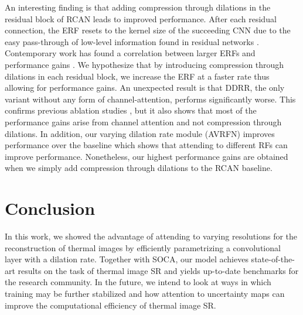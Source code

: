 \documentclass[runningheads]{llncs}
\begin{document}
An interesting finding is that adding compression through dilations in the
residual block of RCAN leads to improved performance. After each residual
connection, the ERF resets to the kernel size of the succeeding CNN due to the
easy pass-through of low-level information found in residual networks
\cite{araujo2019computing}. Contemporary work has found a correlation between
larger ERFs and performance gains \cite{araujo2019computing}. We hypothesize
that by introducing compression through dilations in each residual block, we
increase the ERF at a faster rate thus allowing for performance gains. An
unexpected result is that DDRR, the only variant without any form of
channel-attention, performs significantly worse. This confirms previous
ablation studies \cite{zhang2018image}, but it also shows that most of the
performance gains arise from channel attention and not compression through
dilations. In addition, our varying dilation rate module (AVRFN) improves
performance over the baseline which shows that attending to different RFs can
improve performance. Nonetheless, our highest performance gains are obtained
when we simply add compression through dilations to the RCAN baseline. 

\section{Conclusion}
\label{sec:conclusion}
In this work, we showed the advantage of attending to varying resolutions for
the reconstruction of thermal images by efficiently parametrizing a
convolutional layer with a dilation rate. Together with SOCA, our model achieves
state-of-the-art results on the task of thermal image SR and yields up-to-date
benchmarks for the research community.
In the future, we intend to look at ways in which training may be further 
stabilized and how attention to uncertainty maps can improve the computational 
efficiency of thermal image SR. 
\end{document}
